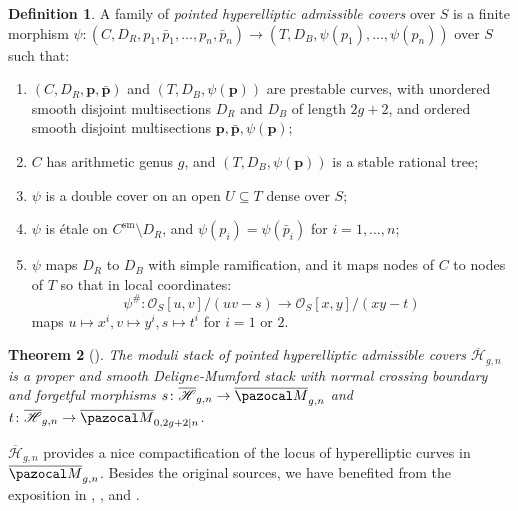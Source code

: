 \documentclass{compositio}
\newcommand{\OO}{\mathcal O}
\renewcommand{\to}{\rightarrow}
\newcommand{\oM}{\overline{\pazocal M}}
\theoremstyle{plain}
\newtheorem{thm}{Theorem}[section]
\theoremstyle{definition}
\newtheorem{definition}[thm]{Definition}
\theoremstyle{remark}
\begin{document}
 
\begin{definition}\label{def:admissiblecover}
 A family of \emph{pointed hyperelliptic admissible covers} over $S$ is a finite morphism $\psi\colon (C,D_R,p_1,\bar p_1,\ldots,p_n,\bar p_n)\to (T,D_B,\psi(p_1),\ldots,\psi(p_n))$ over $S$ such that:
 \begin{enumerate}
  \item $(C,D_R,\mathbf{p},\bar{\mathbf{p}})$ and $(T,D_B,\psi(\mathbf{p}))$ are prestable curves, with unordered smooth disjoint multisections $D_R$ and $D_B$ of length $2g+2$, and ordered smooth disjoint multisections $\mathbf{p},\bar{\mathbf{p}},\psi(\mathbf{p})$;
  \item $C$ has arithmetic genus $g$, and $(T,D_B,\psi(\mathbf{p}))$ is a stable rational tree;
  \item $\psi$ is a double cover on an open $U\subseteq T$ dense over $S$;
  \item\label{point:logetale} $\psi$ is \'etale on $C^\text{sm}\setminus D_R$, and $\psi(p_i)=\psi(\bar p_i)$ for $i=1,\ldots,n$;
  \item $\psi$ maps $D_R$ to $D_B$ with simple ramification, and it maps nodes of $C$ to nodes of $T$ so that in local coordinates:
  \[ \psi^\#\colon \OO_S[u,v]/(uv-s)\to\OO_S[x,y]/(xy-t)\]
  maps $u\mapsto x^i,v\mapsto y^i, s\mapsto t^i$ for $i=1$ or $2$.
 \end{enumerate}
\end{definition}

 \begin{thm}[{\cite{HarrisMumford,Mochizuki}}]
  The moduli stack of pointed hyperelliptic admissible covers $\overline{\mathcal H}_{g,n}$ is a proper and smooth Deligne-Mumford stack with normal crossing boundary and forgetful morphisms $s\colon \overline{\mathcal H}_{g,n}\to\oM_{g,n}$ and  $t\colon \overline{\mathcal H}_{g,n}\to\oM_{0,2g+2|n}$.
 \end{thm}

 $\overline{\mathcal H}_{g,n}$ provides a nice compactification of the locus of hyperelliptic curves in $\oM_{g,n}$. Besides the original sources,  we have benefited from the exposition in \cite[Appendix 2]{Diaz}, \cite[Proposition (3.0.6)]{Cukierman}, and \cite[Theorem 5.45]{HM}.
 
\end{document}
